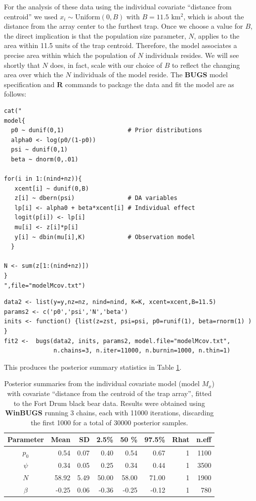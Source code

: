 For the analysis of these data using the individual covariate
``distance from centroid'' we used $x_{i} \sim \mbox{Uniform}(0,B)$
with $B = 11.5$ km$^2$, which is about the distance from the array
center to the furthest trap.  Once we choose a value for $B$, the direct
implication is that the population size parameter, $N$, applies to the area
within 11.5 units of the trap centroid. Therefore, the model
associates a precise area within which the population of $N$ individuals
resides. 
We will see shortly that $N$
does, in fact, scale with our choice of $B$ to reflect the changing
area over which the $N$ individuals of the model reside.  The {\bf
  BUGS} model specification and {\bf R} commands to package the data
and fit the model are as follows:
{\small
\begin{verbatim}
cat("
model{
  p0 ~ dunif(0,1)                  # Prior distributions
  alpha0 <- log(p0/(1-p0))
  psi ~ dunif(0,1)
  beta ~ dnorm(0,.01)

for(i in 1:(nind+nz)){
   xcent[i] ~ dunif(0,B)
   z[i] ~ dbern(psi)               # DA variables
   lp[i] <- alpha0 + beta*xcent[i] # Individual effect
   logit(p[i]) <- lp[i]
   mu[i] <- z[i]*p[i]
   y[i] ~ dbin(mu[i],K)            # Observation model
  }

N <- sum(z[1:(nind+nz)])
}
",file="modelMcov.txt")
\end{verbatim}
}
{\small
\begin{verbatim}
data2 <- list(y=y,nz=nz, nind=nind, K=K, xcent=xcent,B=11.5)
params2 <- c('p0','psi','N','beta')
inits <- function() {list(z=zst, psi=psi, p0=runif(1), beta=rnorm(1) ) }
fit2 <-  bugs(data2, inits, params2, model.file="modelMcov.txt",
              n.chains=3, n.iter=11000, n.burnin=1000, n.thin=1)
\end{verbatim}
}
This produces the posterior summary statistics in Table \ref{closed.tab.bear2}.

\begin{table}[ht]
  \caption{
    Posterior summaries from the individual covariate model (model
    $M_{x}$) with
    covariate ``distance from the centroid of the trap array'', 
 fitted to the Fort Drum black
    bear data. Results 
    were obtained using {\bf WinBUGS}
    running 3 chains, each with 11000 iterations, discarding the
    first 1000 for a total of 30000 posterior samples. 
}
\begin{tabular}{crrrrrrr} \hline \hline
Parameter &  Mean&  SD  &   2.5\% &  50 \%  &   97.5\% &Rhat& n.eff  \\ \hline
$p_0$         &0.54  &0.07  & 0.40   &  0.54  &  0.67  &  1 & 1100  \\
$\psi$        &0.34  &0.05  & 0.25   &  0.34  &  0.44  &  1 & 3500 \\
$N$          &58.92 & 5.49 & 50.00  &  58.00 &  71.00 &   1&  1900 \\
$\beta$       &-0.25 & 0.06 & -0.36  &  -0.25 &  -0.12 &   1&   780 \\ \hline
\end{tabular}
\label{closed.tab.bear2}
\end{table}



